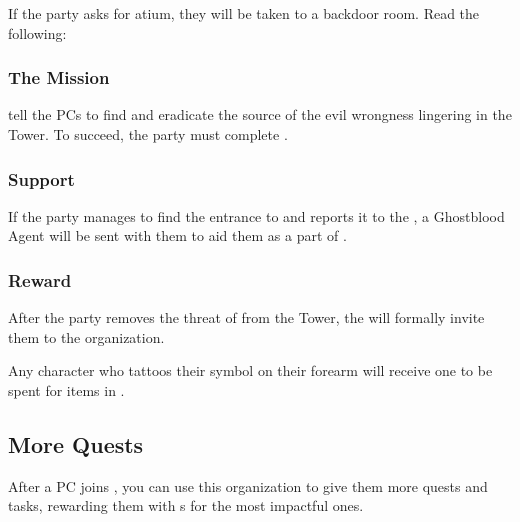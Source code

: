 If the party asks for atium, they will be taken to a backdoor room. Read the following:


\subsubsection{The Mission}

\npcFractionGhostbloods{} tell the PCs to find and eradicate the source of the evil wrongness lingering in the Tower. To succeed, the party must complete .

\subsubsection{Support}

If the party manages to find the entrance to  and reports it to the \npcFractionGhostbloods{}, a Ghostblood Agent will be sent with them to aid them as a part of .

\subsubsection{Reward}

After the party removes the threat of \npcMidnightMother{} from the Tower, the \npcFractionGhostbloods{} will formally invite them to the organization.

Any character who tattoos their symbol on their forearm will receive one \lootScadrialCoin{} to be spent for items in .



\subsection{More Quests}

After a PC joins \npcFractionGhostbloods{}, you can use this organization to give them more quests and tasks, rewarding them with \lootScadrialCoin{}s for the most impactful ones.

